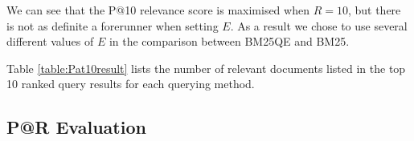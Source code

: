 We can see that the P@10 relevance score is maximised when $R=10$, but there is not as definite a forerunner when setting $E$. As a result we chose to use several different values of $E$ in the comparison between BM25QE and BM25.

\begin{centering}
\begin{table}
\caption {P@10 relevance score for each query method}\label{table:Pat10result}
\end{table}
\end{centering}

Table \ref{table:Pat10result} lists the number of relevant documents listed in the top 10 ranked query results for each querying method.

\newpage
\subsection*{P@R Evaluation}